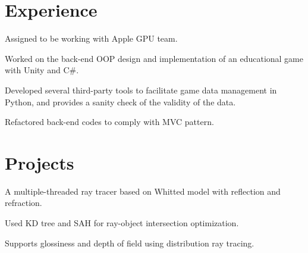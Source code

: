 \documentclass[]{deedy-resume-openfont}
\begin{document}
\hfill
\begin{minipage}[t]{0.66\textwidth} 


\section{Experience}

\vspace{\topsep} %
\begin{tightemize} 
\item Assigned to be working with Apple GPU team.
\end{tightemize}
\sectionsep

\vspace{\topsep} %
\begin{tightemize} 
\item Worked on the back-end OOP design and implementation of an educational game with Unity and C\#.
\item Developed several third-party tools to facilitate game data management in Python, and provides a sanity check of the validity of the data.
\item Refactored back-end codes to comply with MVC pattern.
\end{tightemize}
\sectionsep



\section{Projects}

\begin{tightemize} 
\item A multiple-threaded ray tracer based on Whitted model with reflection and refraction.
\item Used KD tree and SAH for ray-object intersection optimization.
\item Supports glossiness and depth of field using distribution ray tracing.
\end{tightemize}
\sectionsep


\end{minipage}
\end{document}
